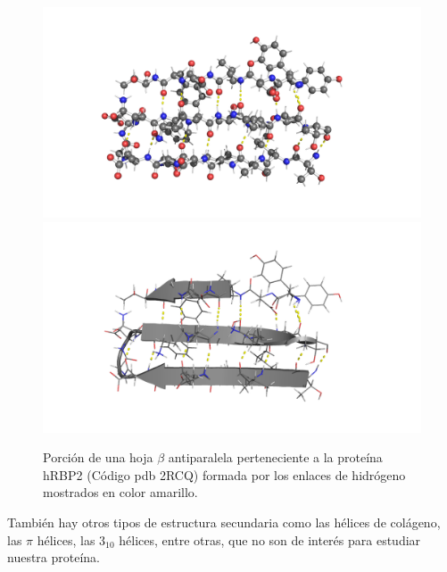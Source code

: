 \begin{figure}[H]
\centering
\includegraphics[scale=0.2]{Kap3/beta2.png}
\includegraphics[scale=0.2]{Kap3/beta.png}
\caption{Porci\'{o}n de una hoja $\beta$ antiparalela perteneciente a la prote\'{i}na hRBP2 (C\'{o}digo pdb 2RCQ) formada por los enlaces de hidr\'{o}geno mostrados en color amarillo.}\label{fig:beta}
\end{figure}
Tambi\'{e}n hay otros tipos de estructura secundaria como las h\'{e}lices de col\'{a}geno, las $\pi$ h\'{e}lices, las $3_{10}$ h\'{e}lices, entre otras, que no son de inter\'{e}s para estudiar nuestra prote\'{i}na.\\

